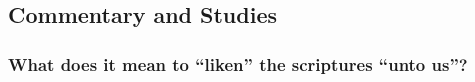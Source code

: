 	


	
	
	
	
\subsection{Commentary and Studies} %
	\label{LIKEN-COMMENTARY}

	
		
	\subsubsection{What does it mean to ``liken'' the scriptures ``unto us''?}
		\label{LIKEN-scriptures}